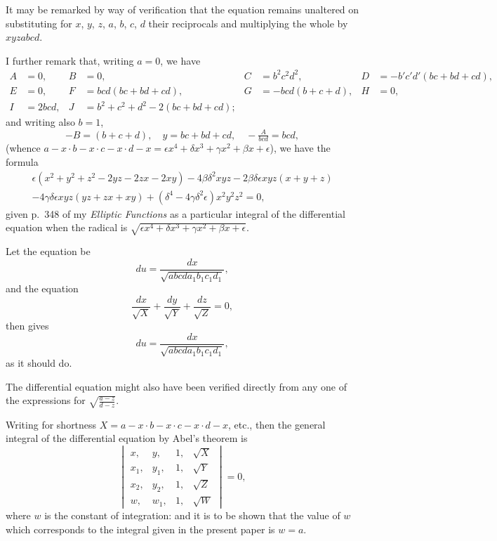 \documentclass[11pt,a4paper]{book}
\begin{document}
It may be remarked by way of verification that the equation remains unaltered on substituting for $x$, $y$, $z$, $a$, $b$, $c$, $d$ their reciprocals and multiplying the whole by $xyzabcd$.

I further remark that, writing $a = 0$, we have
\begin{align*}
A &= 0, & B &= 0, & C &= b^2c^2d^2, & D &= -b'c'd'(bc + bd + cd), \\
E &= 0, & F &= bcd(bc + bd + cd), & G &= -bcd(b + c + d), & H &= 0, \\
I &= 2bcd, & J &= b^2 + c^2 + d^2 - 2(bc + bd + cd); & & & &
\end{align*}
and writing also $b = 1$,
\[-B = (b + c + d), \quad y = bc + bd + cd, \quad -\tfrac{A}{bcd} = bcd,\]
(whence $a - x \cdot b - x \cdot c - x \cdot d - x = \epsilon x^4 + \delta x^3 + \gamma x^2 + \beta x + \epsilon$),
we have the formula
\begin{multline*}
\epsilon(x^2 + y^2 + z^2 - 2yz - 2zx - 2xy) - 4\beta\delta^2 xyz - 2\beta\delta\epsilon xyz(x + y + z) \\
- 4\gamma\delta\epsilon xyz(yz + zx + xy) + (\delta^4 - 4\gamma\delta^2\epsilon)x^2y^2z^2 = 0,
\end{multline*}
given p.\ 348 of my \textit{Elliptic Functions} as a particular integral of the differential equation when the radical is $\sqrt{\epsilon x^4 + \delta x^3 + \gamma x^2 + \beta x + \epsilon}$.

\clearpage
Let the equation be
\[
du = \frac{dx}{\sqrt{abcda_1b_1c_1d_1}},
\]
and the equation
\[
\frac{dx}{\sqrt{X}} + \frac{dy}{\sqrt{Y}} + \frac{dz}{\sqrt{Z}} = 0,
\]
then gives
\[
du = \frac{dx}{\sqrt{abcda_1b_1c_1d_1}},
\]
as it should do.

The differential equation might also have been verified directly from any one of the expressions for $\sqrt{\frac{a - z}{d - z}}$.

Writing for shortness $X = a - x \cdot b - x \cdot c - x \cdot d - x$, etc., then the general integral of the differential equation by Abel's theorem is
\[
\begin{vmatrix}
x, & y, & 1, & \sqrt{X} \\
x_1, & y_1, & 1, & \sqrt{Y} \\
x_2, & y_2, & 1, & \sqrt{Z} \\
w, & w_1, & 1, & \sqrt{W}
\end{vmatrix}
= 0,
\]
where $w$ is the constant of integration: and it is to be shown that the value of $w$ which corresponds to the integral given in the present paper is $w = a$.
\end{document}
